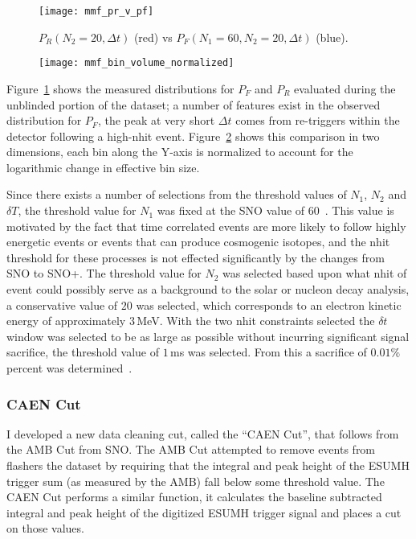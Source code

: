 \begin{figure}[htbp]
    \centering
    \texttt{[image: mmf\_pr\_v\_pf]}
    \caption[Missed Muon Follower Example PDFs]{
        $P_R(N_2=20, \Delta t)$ (red) vs $P_F(N_1=60, N_2=20, \Delta t)$ (blue).}
\label{fig:mmf_sac}
\end{figure}
\begin{figure}[htbp]
    \centering
    \texttt{[image: mmf\_bin\_volume\_normalized]}
    \caption[Two-Dimensional Comparison for Missed Muon Follower]{
}
\label{fig:mmf_sac2}
\end{figure}
Figure~\ref{fig:mmf_sac} shows the measured distributions for $P_{F}$ and $P_{R}$
evaluated during the unblinded portion of the dataset;
a number of features exist in the observed distribution for $P_{F}$,
the peak at very short $\Delta t$ comes from re-triggers within the
detector following a high-nhit event.
Figure~\ref{fig:mmf_sac2} shows this comparison in two dimensions, each
bin along the Y-axis is normalized to account for the logarithmic change
in effective bin size.

Since there exists a number of selections from the threshold values of $N_{1}$,
$N_{2}$ and $\delta T$, the threshold value for $N_{1}$ was fixed at the SNO value
of $60$~\citep{neil_thesis}.
This value is motivated by the fact that time correlated events are more
likely to follow highly energetic events or events that can produce cosmogenic
isotopes, and the nhit threshold for these processes is not effected significantly
by the changes from SNO to SNO+.
The threshold value for $N_{2}$ was selected based upon what nhit of event
could possibly serve as a background to the solar or nucleon decay analysis,
a conservative value of $20$ was selected, which corresponds to an electron kinetic energy
of approximately $3$\,MeV.
With the two nhit constraints selected the $\delta t$ window was selected to
be as large as possible without incurring significant signal sacrifice,
the threshold value of $1$\,ms was selected.
From this a sacrifice of $0.01\%$ percent was determined~\citep{dc_document}.

\subsubsection{CAEN Cut}
I developed a new data cleaning cut, called the ``CAEN Cut'', that follows from
the AMB Cut from SNO\@.
The AMB Cut attempted to remove events from flashers the dataset by requiring
that the integral and peak height of the ESUMH trigger sum (as measured by the
AMB) fall below some threshold value.
The CAEN Cut performs a similar function, it calculates the baseline subtracted
integral and peak height of the digitized ESUMH trigger signal and places a cut on those values.

